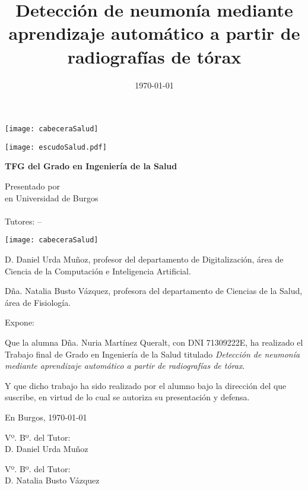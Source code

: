 \documentclass[a4paper,12pt,twoside]{memoir}
\title{Detección de neumonía mediante aprendizaje automático a partir de radiografías de tórax}
\author{\nombre}
\date{\today}
\makeatletter
\def\maketitle{
  \null
  \thispagestyle{empty}
\begin{center}
  \noindent\texttt{[image: cabeceraSalud]}\vspace{1.5cm}%
\end{center}
  
  \begin{center}
    \begin{minipage}[c][1.5cm][c]{.20\textwidth}
        \texttt{[image: escudoSalud.pdf]}
    \end{minipage}
  \end{center}
  
  \begin{center}
    \colorbox{cpardoBox}{%
        \begin{minipage}{.8\textwidth}
          \vspace{.5cm}\Large
          \begin{center}
          \textbf{TFG del Grado en Ingeniería de la Salud}\vspace{.6cm}\\
          \textbf{\LARGE\@title{}}
          \end{center}
          \vspace{.2cm}
        \end{minipage}
    }%
  \end{center}
  
  \begin{center}%
  {%
    \noindent\LARGE
    Presentado por \@author{}\\ 
    en Universidad de Burgos\\
    \vspace{0.5cm}
    \noindent\Large
    \@date{}\\
    \vspace{0.5cm}
    Tutores: \@tutor{} -- \@tutorb{}\\
  }%
  \end{center}%
  \null
  \cleardoublepage
  }
\newcommand{\nombre}{Nuria Martínez Queralt}
\newcommand{\nombreTutor}{Daniel Urda Muñoz}
\newcommand{\nombreTutorb}{Natalia Busto Vázquez}
\newcommand{\dni}{71309222E}
\makeatother
\begin{document}
\maketitle


\newpage\null\thispagestyle{empty}\newpage

\thispagestyle{empty}


\noindent\texttt{[image: cabeceraSalud]}\vspace{1cm}

\noindent D. \nombreTutor, profesor del departamento de Digitalización, área de Ciencia de la Computación e Inteligencia Artificial.

\noindent Dña. \nombreTutorb, profesora del departamento de Ciencias de la
Salud, área de Fisiología.

\noindent Expone:

\noindent Que la alumna Dña. \nombre, con DNI \dni, ha realizado el Trabajo final de Grado en Ingeniería de la Salud titulado \textit{Detección de neumonía mediante aprendizaje automático a partir de radiografías de tórax}. 

\noindent Y que dicho trabajo ha sido realizado por el alumno bajo la dirección del que suscribe, en virtud de lo cual se autoriza su presentación y defensa.

\begin{center} %
En Burgos, {\large \today}
\end{center}

\vfill\vfill\vfill

\begin{minipage}{0.45\textwidth}
\begin{flushleft} %
Vº. Bº. del Tutor:\\[2cm]
D. \nombreTutor
\end{flushleft}
\end{minipage}
\hfill
\begin{minipage}{0.45\textwidth}
\begin{flushleft} %
Vº. Bº. del Tutor:\\[2cm]
D. \nombreTutorb
\end{flushleft}
\end{minipage}
\hfill

\vfill

\end{document}
